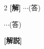 \documentclass[../../../../main.tex]{subfiles}
\begin{document}
\setcounter{equation}{0}
\begin{oframed}
  
\end{oframed}
\setlength{\columnseprule}{0.4pt}
\begin{multicols}{2}
  {\bf[解]}
  $\cdots$(答)

  \vspace{10pt}
  $\cdots$(答)

  \vspace{10pt}
  {\bf[解説]}

  \newpage
\end{multicols}
\end{document}
